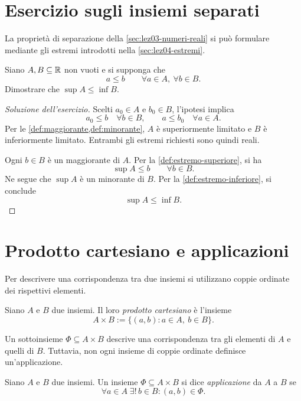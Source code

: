 \section{Esercizio sugli insiemi separati}
\label{sec:lez06-insiemi-separati}

La proprietà di separazione della \cref{sec:lez03-numeri-reali}
si può formulare mediante gli estremi introdotti nella
\cref{sec:lez04-estremi}.

\begin{exercise}
\label{ex:lez06-estremi-separati}
Siano \(A,B\subseteq\mathbb{R}\) non vuoti e si supponga che
\[
  a\le b\qquad\forall a\in A,\ \forall b\in B.
\]
Dimostrare che \(\sup A\le\inf B\).
\end{exercise}

\begin{proof}[Soluzione dell'esercizio]
Scelti \(a_0\in A\) e \(b_0\in B\), l'ipotesi implica
\[
  a_0\le b\quad\forall b\in B,
  \qquad a\le b_0\quad\forall a\in A.
\]
Per le \cref{def:maggiorante,def:minorante}, \(A\) è
superiormente limitato e \(B\) è inferiormente limitato.
Entrambi gli estremi richiesti sono quindi reali.

Ogni \(b\in B\) è un maggiorante di \(A\).
Per la \cref{def:estremo-superiore}, si ha
\[
  \sup A\le b\qquad\forall b\in B.
\]
Ne segue che \(\sup A\) è un minorante di \(B\).
Per la \cref{def:estremo-inferiore}, si conclude
\[
  \sup A\le\inf B.
\]
\end{proof}

\section{Prodotto cartesiano e applicazioni}
\label{sec:lez06-applicazioni}

Per descrivere una corrispondenza tra due insiemi
si utilizzano coppie ordinate dei rispettivi elementi.

\begin{definition}
\label{def:lez06-prodotto-cartesiano}
Siano \(A\) e \(B\) due insiemi. Il loro
\emph{prodotto cartesiano} è l'insieme
\[
  A\times B:=\{(a,b):a\in A,\ b\in B\}.
\]
\end{definition}

Un sottoinsieme \(\Phi\subseteq A\times B\)
descrive una corrispondenza tra gli elementi
di \(A\) e quelli di \(B\). Tuttavia, non ogni insieme
di coppie ordinate definisce un'applicazione.

\begin{definition}[Applicazione]
\label{def:lez06-applicazione}
Siano \(A\) e \(B\) due insiemi. Un insieme
\(\Phi\subseteq A\times B\) si dice
\emph{applicazione} da \(A\) a \(B\) se
\[
  \forall a\in A\;\exists!\,b\in B:
  (a,b)\in\Phi.
\]
\end{definition}

